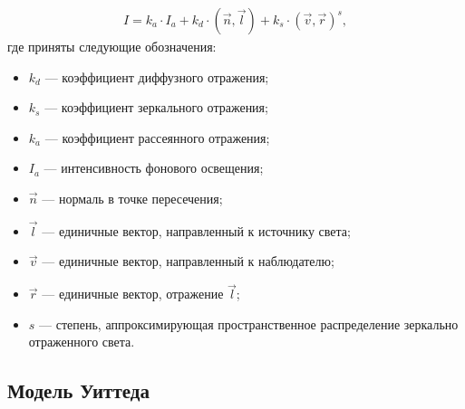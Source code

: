 \begin{equation} \label{eq:fong}
	\begin{aligned}
		I = k_{a} \cdot I_{a} + k_{d} \cdot (\vec{n}, \vec{l}) + k_{s} \cdot (\vec{v}, \vec{r})^s,
	\end{aligned}
\end{equation}
где приняты следующие обозначения:
\begin{itemize}[label=---]
	\item $k_{d}$ --- коэффициент диффузного отражения;
	\item $k_{s}$ --- коэффициент зеркального отражения;
	\item $k_{a}$ --- коэффициент рассеянного отражения;
	\item $I_{a}$ --- интенсивность фонового освещения;
	\item $\vec{n}$ ---  нормаль в точке пересечения;
	\item $\vec{l}$ --- единичные вектор, направленный к источнику света;
	\item $\vec{v}$ --- единичные вектор, направленный к наблюдателю;
	\item $\vec{r}$ --- единичные вектор, отражение  $\vec{l}$;
	\item $s$ --- степень, аппроксимирующая пространственное распределение зеркально отраженного света.
\end{itemize}


\subsection{Модель Уиттеда}

